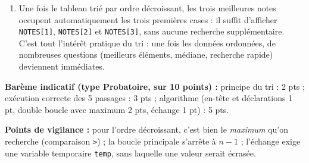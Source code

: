 \documentclass[11pt]{article}
\begin{document}
\begin{corrige}
\begin{enumerate}
\item Une fois le tableau trié par ordre décroissant, les trois meilleures notes occupent automatiquement les trois premières cases : il suffit d'afficher \texttt{NOTES[1]}, \texttt{NOTES[2]} et \texttt{NOTES[3]}, sans aucune recherche supplémentaire. C'est tout l'intérêt pratique du tri : une fois les données ordonnées, de nombreuses questions (meilleurs éléments, médiane, recherche rapide) deviennent immédiates.
\end{enumerate}

\textbf{Barème indicatif (type Probatoire, sur 10 points) :} principe du tri : 2 pts ; exécution correcte des 5 passages : 3 pts ; algorithme (en-tête et déclarations 1 pt, double boucle avec maximum 2 pts, échange 1 pt) : 5 pts.

\textbf{Points de vigilance :} pour l'ordre décroissant, c'est bien le \emph{maximum} qu'on recherche (comparaison \texttt{>}) ; la boucle principale s'arrête à $n - 1$ ; l'échange exige une variable temporaire \texttt{temp}, sans laquelle une valeur serait écrasée.
\end{corrige}
\end{document}
